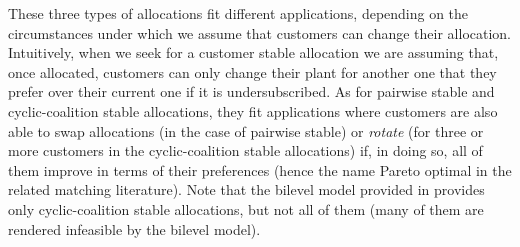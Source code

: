\documentclass[preprint,11pt,authoryear]{elsarticle}
\begin{document}
These three types of allocations fit different applications, depending on the circumstances under which we assume that customers can change their allocation. Intuitively, when we seek for a customer stable allocation we are assuming that, once allocated, customers can only change their plant for another one that they prefer over their current one if it is undersubscribed. As for pairwise stable and cyclic-coalition stable allocations, they fit applications where customers are also able to swap allocations (in the case of pairwise stable) or \emph{rotate} (for three or more customers in the cyclic-coalition stable allocations) if, in doing so, all of them improve in terms of their preferences (hence the name Pareto optimal in the related matching literature). Note that the bilevel model provided in \citep{calvete2020} provides only cyclic-coalition stable allocations, but not all of them (many of them are rendered infeasible by the bilevel model).
\end{document}
